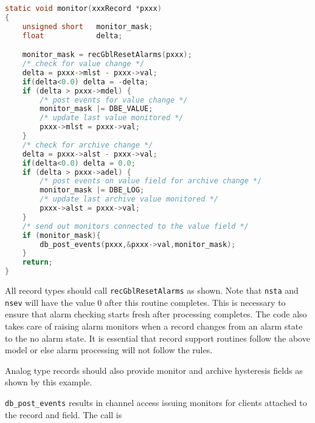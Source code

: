 \begin{lstlisting}[language=C]
static void monitor(xxxRecord *pxxx)
{
    unsigned short   monitor_mask;
    float            delta;

    monitor_mask = recGblResetAlarms(pxxx);
    /* check for value change */
    delta = pxxx->mlst - pxxx->val;
    if(delta<0.0) delta = -delta;
    if (delta > pxxx->mdel) {
        /* post events for value change */
        monitor_mask |= DBE_VALUE;
        /* update last value monitored */
        pxxx->mlst = pxxx->val;
    }
    /* check for archive change */
    delta = pxxx->alst - pxxx->val;
    if(delta<0.0) delta = 0.0;
    if (delta > pxxx->adel) {
        /* post events on value field for archive change */
        monitor_mask |= DBE_LOG;
        /* update last archive value monitored */
        pxxx->alst = pxxx->val;
    }
    /* send out monitors connected to the value field */
    if (monitor_mask){
        db_post_events(pxxx,&pxxx->val,monitor_mask);
    }
    return;
}
\end{lstlisting}

All record types should call \verb|recGblResetAlarms| as shown.
Note that \verb|nsta| and \verb|nsev| will have the value 0 after this routine completes.
This is necessary to ensure that alarm checking starts fresh after processing completes.
The code also takes care of raising alarm monitors when a record changes from an alarm state to the no alarm state.
It is essential that record support routines follow the above model or else alarm processing will not follow the rules.

Analog type records should also provide monitor and archive hysteresis fields as shown by this example.

\verb|db_post_events| results in channel access issuing monitors for clients attached to the record and field.
The call is

